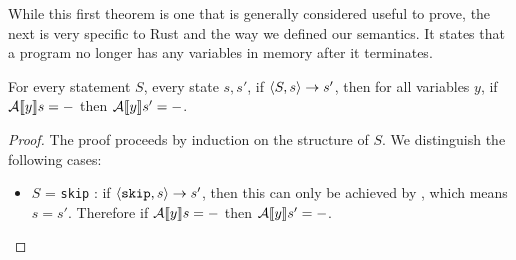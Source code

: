 While this first theorem is one that is generally considered useful to prove, the next is very specific to Rust and the way we defined our semantics. It states that a program no longer has any variables in memory after it terminates. 

\begin{theorem}
For every statement $S$, every state $s, s'$, if $\langle S, s \rangle \to s'$, then for all variables $y$, if $\mathcal{A} \llbracket y \rrbracket s = -$ then $\mathcal{A} \llbracket y \rrbracket s' = -$.
\end{theorem}

\begin{proof}
The proof proceeds by induction on the structure of $S$. We distinguish the following cases:
\begin{itemize}[noitemsep]

    \item $S$ = \texttt{skip} : if $\langle \texttt{skip}, s \rangle \to s'$, then this can only be achieved by \skipns, which means $s=s'$. Therefore if $\mathcal{A} \llbracket y \rrbracket s = -$ then $\mathcal{A} \llbracket y \rrbracket s' = -$. 
    

\end{itemize}
\end{proof}
